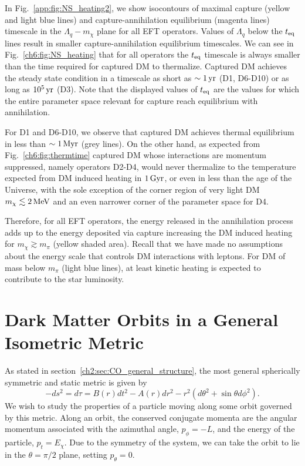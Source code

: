 In Fig.~\ref{app:fig:NS_heating2}, we show isocontours of maximal capture (yellow and light blue lines) and capture-annihilation equilibrium (magenta lines) timescale in the $\Lambda_q-m_\chi$ plane for all  EFT operators.  
Values of $\Lambda_q$ below the $t_{\rm eq}$ lines result in smaller capture-annihilation equilibrium timescales. 
We can see in Fig.~\ref{ch6:fig:NS_heating} that for all operators the $t_{\rm eq}$ timescale is always smaller than the time required for captured DM to thermalize. Captured DM achieves the steady state condition in a timescale as short as $\sim1{\rm \,yr}$ (D1, D6-D10) or as long as $10^5{\rm \,yr}$ (D3). 
Note that the displayed values of $t_{\rm eq}$ are the values for which the entire parameter space relevant for capture reach equilibrium with annihilation. 

For D1 and D6-D10, we observe that captured DM achieves thermal equilibrium in less than $\sim 1{\rm \,Myr}$ (grey lines). 
On the other hand, as expected from Fig.~\ref{ch6:fig:thermtime} captured DM whose interactions are momentum suppressed, namely operators D2-D4, would never thermalize to the temperature expected from DM induced heating in $1{\rm \,Gyr}$, or even in less than the age of the 
Universe,
with the sole exception of the corner region of very light DM $m_\chi\lesssim 2{\rm \,MeV}$ and an even narrower corner of the parameter space for D4. 

Therefore, for all EFT operators,  the energy released in the annihilation process adds up to the energy deposited via capture increasing the DM induced heating  
for $m_\chi\gtrsim m_\pi$ (yellow shaded area). 
Recall that we have made no assumptions about the energy scale that controls DM interactions with leptons. 
For DM of mass below $m_\pi$ (light blue lines), at least kinetic heating is expected to contribute to the star luminosity.  

\section{Dark Matter Orbits in a General Isometric Metric}
\label{app:sec:DM_orbits}

As stated in section~\ref{ch2:sec:CO_general_structure}, the most general spherically symmetric and static metric is given by
\begin{equation}
    -ds^2 = d\tau = B(r) dt^2 - A(r) dr^2 - r^2( d\theta^2+ \sin\theta d\phi^2).
\end{equation}
We wish to study the properties of a particle moving along some orbit governed by this metric. 
Along an orbit, the conserved conjugate momenta are the angular momentum associated with the azimuthal angle, $p_\phi = -L$, 
and the energy of the particle, $p_t = E_\chi$. Due to the symmetry of the system, we can take the orbit to lie in the $\theta = \pi/2$ plane, setting $p_\theta = 0$. 

